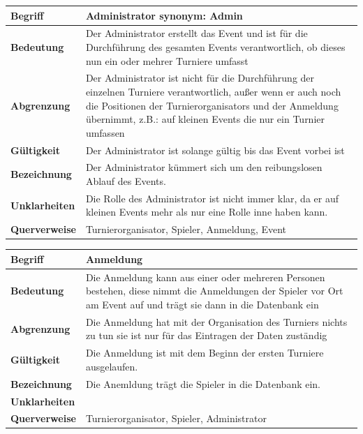 \documentclass[11pt]{article}
\begin{document}
\begin{tabularx}{\textwidth}{| p{} | p{} |}
	\hline
	\textbf{Begriff} & Administrator synonym: Admin\\
	\hline
	\textbf{Bedeutung} & Der Administrator erstellt das Event und ist für die Durchführung des gesamten Events verantwortlich, ob dieses nun ein oder mehrer Turniere umfasst\\
	\hline
	\textbf{Abgrenzung} & Der Administrator ist nicht für die Durchführung der einzelnen Turniere verantwortlich, außer wenn er auch noch die Positionen der Turnierorganisators und der Anmeldung übernimmt, z.B.: auf kleinen Events die nur ein Turnier umfassen\\
	\hline
	\textbf{Gültigkeit} & Der Administrator ist solange gültig bis das Event vorbei ist\\
	\hline
	\textbf{Bezeichnung} & Der Administrator kümmert sich um den reibungslosen Ablauf des Events.\\
	\hline
	\textbf{Unklarheiten} & Die Rolle des Administrator ist nicht immer klar, da er auf kleinen Events mehr als nur eine Rolle inne haben kann.\\
	\hline
	\textbf{Querverweise} &  Turnierorganisator, Spieler, Anmeldung, Event\\
	\hline
\end{tabularx}

\begin{tabularx}{\textwidth}{| p{} | p{} |}
	\hline
	\textbf{Begriff} & Anmeldung\\
	\hline
	\textbf{Bedeutung} & Die Anmeldung kann aus einer oder mehreren Personen bestehen, diese nimmt die Anmeldungen der Spieler vor Ort am Event auf und trägt sie dann in die Datenbank ein\\
	\hline
	\textbf{Abgrenzung} & Die Anmeldung hat mit der Organisation des Turniers nichts zu tun sie ist nur für das Eintragen der Daten zuständig\\
	\hline
	\textbf{Gültigkeit} & Die Anmeldung ist mit dem Beginn der ersten Turniere ausgelaufen. \\
	\hline
	\textbf{Bezeichnung} & Die Anemldung trägt die Spieler in die Datenbank ein.\\
	\hline
	\textbf{Unklarheiten} & \\
	\hline
	\textbf{Querverweise} &  Turnierorganisator, Spieler, Administrator\\
	\hline
\end{tabularx}
\end{document}
